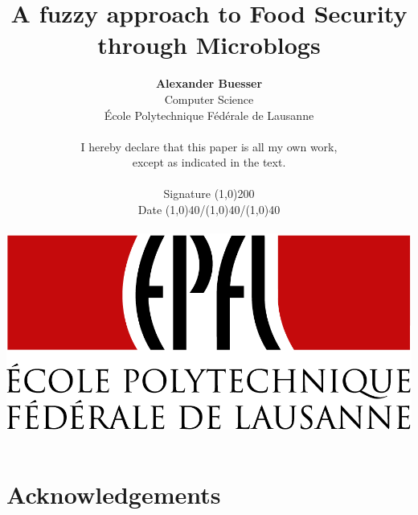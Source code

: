 \documentclass[12pt]{report}
\begin{document}
\pagestyle{empty}
\setcounter{page}{-100}

\date{} %
\title{\textbf{A fuzzy approach to Food Security through Microblogs }}
\author{\textbf{Alexander Buesser}\\
Computer Science\\
\'{E}cole Polytechnique F\'{e}d\'{e}rale de Lausanne\\
\\
I hereby declare that this paper is all my own work,\\
except as indicated in the text.\\
\\
Signature \line(1,0){200}\\
Date \line(1,0){40}/\line(1,0){40}/\line(1,0){40}\\
\\ 
\includegraphics[scale=0.2]{epfl_logo}}

\maketitle
%
%



\newpage

%
%

\pagestyle{fancy}
\lhead[]{\thepage}
\rhead[\thepage]{}



\section*{Acknowledgements}


\newpage

%
%

\tableofcontents

%
%
\end{document}
